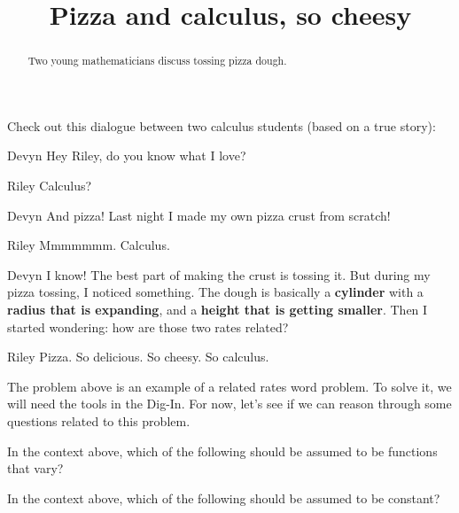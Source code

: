 \documentclass{ximera}
\title[Break-Ground:]{Pizza and calculus, so cheesy}
\begin{document}
\begin{abstract}
Two young mathematicians discuss tossing pizza dough. 
\end{abstract}
\maketitle

Check out this dialogue between two calculus students (based on a true
story):


\begin{dialogue}
\item[Devyn] Hey Riley, do you know what I love?
\item[Riley] Calculus? 
\item[Devyn] And pizza! Last night I made my own pizza crust from
  scratch!
\item[Riley] Mmmmmmm. Calculus. 
\item[Devyn] I know! The best part of making the crust is tossing it.
  But during my pizza tossing, I noticed something.  The
  dough is basically a \textbf{cylinder} with a \textbf{radius that is
    expanding}, and a \textbf{height that is getting smaller}. Then I started
    wondering: how are those two rates related?
\item[Riley] Pizza. So delicious. So cheesy. So calculus.
\end{dialogue}


The problem above is an example of a related rates word problem.  To solve 
it, we will need the tools in the Dig-In.  For now, let's see if we can reason 
through some questions related to this problem.



\begin{problem}
  In the context above, which of the following should be assumed to be
  functions that vary?
  \begin{selectAll}
  \end{selectAll}
\end{problem}

\begin{problem}
  In the context above, which of the following should be assumed to be
  constant?
  \begin{selectAll}
  \end{selectAll}
\end{problem}


%
\end{document}
